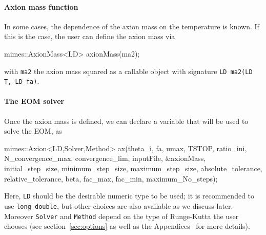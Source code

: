 \documentclass[11pt,a4paper]{article}
\begin{document}
\paragraph{Axion mass function} 
In some cases, the dependence of the axion mass on the temperature is known. If this is the case, the user can define the axion mass via 
%
\begin{cpp}
	mimes::AxionMass<LD> axionMass(ma2);
\end{cpp}
%
with {\tt ma2} the axion mass squared as a callable object with signature {\tt LD ma2(LD T, LD fa)}.

\paragraph{The EOM solver}
Once the axion mass is defined, we can declare a variable that will be used to solve the EOM, as
%
\begin{cpp}
	mimes::Axion<LD,Solver,Method> ax(theta_i, fa, umax, TSTOP, ratio_ini, 
	N_convergence_max, convergence_lim, inputFile, &axionMass, initial_step_size,
	minimum_step_size, maximum_step_size, absolute_tolerance, relative_tolerance, 
	beta, fac_max, fac_min, maximum_No_steps);
\end{cpp}
%
Here, {\tt LD} should be the desirable numeric type to be used; it is recommended to use {\tt long double}, but other choices are also available as we discuss later. Moreover {\tt Solver} and {\tt Method} depend on the type of Runge-Kutta the user chooses (see section~\ref{sec:options} as well as the Appendices~ for more details). 
\end{document}
